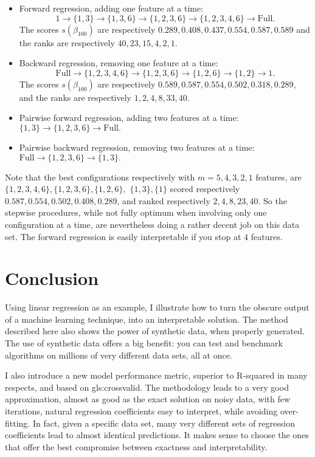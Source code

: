 \documentclass[oneside,10pt]{book}
\begin{document}
\begin{itemize}
\item Forward regression, adding one feature at a time:
$$1 \rightarrow \{1, 3\} \rightarrow \{1, 3, 6\} \rightarrow \{1, 2, 3, 6\}
 \rightarrow \{1, 2, 3, 4, 6\}  \rightarrow \text{Full}.$$
The scores $s(\beta_{100})$ are respectively $0.289,0.408, 0.437, 0.554, 0.587, 0.589$ and the ranks
are respectively $40, 23, 15, 4, 2, 1$.

\item Backward regression, removing one feature at a time:
$$\text{Full} \rightarrow \{1, 2, 3, 4, 6\}
\rightarrow \{1, 2, 3, 6\} \rightarrow \{1, 2, 6\} \rightarrow \{1, 2\} \rightarrow 1.$$
The scores $s(\beta_{100})$ are respectively $0.589, 0.587, 0.554, 0.502, 0.318, 0.289$, and the ranks
are respectively $1, 2, 4, 8, 33, 40$.

\item Pairwise forward regression, adding two features at a time:   $\{1,3\} \rightarrow \{1,2,3,6\} \rightarrow \text{Full}.$

\item Pairwise backward regression, removing two features at a time: $\text{Full} \rightarrow \{1,2,3,6\} \rightarrow \{1,3\}.$
\end{itemize}
Note that the best configurations respectively with $m=5, 4, 3, 2, 1$ features, are $\{1, 2, 3, 4, 6\}, \{1, 2, 3, 6\}, \{1, 2, 6\},$ $\{1, 3\}, \{1\}$ scored respectively $0.587, 0.554, 0.502, 0.408, 0.289$, and ranked respectively $2, 4, 8, 23, 40$. So the stepwise procedures,
while not fully optimum when involving only one configuration at a time, are nevertheless doing a rather decent job on this data set. The forward regression is easily  interpretable if you stop at $4$ features.

\section{Conclusion}

Using linear regression as an example, I illustrate how to turn the obscure output of a machine learning technique, into an interpretable solution.  The method described here also shows the power of synthetic data, when properly generated. The use of synthetic data offers a big benefit: you can test and benchmark algorithms on millions of very different data sets, all at once.

I also introduce a new model performance metric, superior to R-squared in many respects, and based on \gls{gls:crossvalid}.
The methodology leads to a very good approximation, almost as good as the exact solution on noisy data, with few iterations, natural regression coefficients easy to interpret, while avoiding over-fitting. In fact, given a specific data set, many very different sets of regression coefficients lead to almost identical predictions. It makes sense to choose the ones that offer the best compromise between exactness and interpretability.
\end{document}
